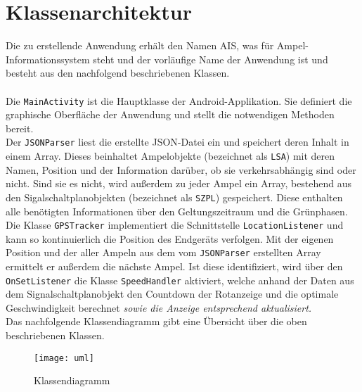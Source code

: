 \section{Klassenarchitektur}
Die zu erstellende Anwendung erhält den Namen AIS, was für Ampel-Informationssystem steht und der vorläufige Name der Anwendung ist und besteht aus den nachfolgend beschriebenen Klassen. \\\\
Die \texttt{MainActivity} ist die Hauptklasse der Android-Applikation. Sie definiert die graphische Oberfläche der Anwendung und stellt die notwendigen Methoden bereit. \\
Der \texttt{\gls{JSON}Parser} liest die erstellte \gls{JSON}-Datei ein und speichert deren Inhalt in einem Array. Dieses beinhaltet Ampelobjekte (bezeichnet als \texttt{LSA}) mit deren Namen, Position und der Information darüber, ob sie verkehrsabhängig sind oder nicht. Sind sie es nicht, wird außerdem zu jeder Ampel ein Array, bestehend aus den Sigalschaltplanobjekten (bezeichnet als \texttt{SZPL}) gespeichert. Diese enthalten alle benötigten Informationen über den Geltungszeitraum und die Grünphasen.\\ 
Die Klasse \texttt{GPSTracker} implementiert die Schnittstelle \texttt{LocationListener} und kann so kontinuierlich die Position des Endgeräts verfolgen. Mit der eigenen Position und der aller Ampeln aus dem vom \texttt{JSONParser} erstellten Array ermittelt er außerdem die nächste Ampel. Ist diese identifiziert, wird über den \texttt{OnSetListener} die Klasse \texttt{SpeedHandler} aktiviert, welche anhand der Daten aus dem Signalschaltplanobjekt den Countdown der Rotanzeige und die optimale Geschwindigkeit berechnet \textit{sowie die Anzeige entsprechend aktualisiert.} \\
Das nachfolgende Klassendiagramm gibt eine Übersicht über die oben beschriebenen Klassen.\\
\begin{figure}[H]  
    \centering  
    \texttt{[image: uml]} 
    \grayRule
    \caption{Klassendiagramm}
    \label{fig:uml}
\end{figure}
